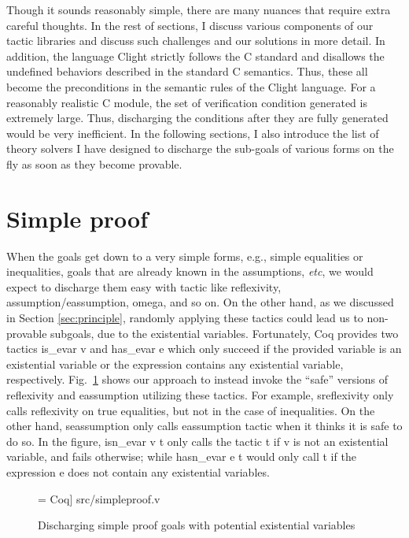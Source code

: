 Though it sounds reasonably simple, there are many nuances that require extra
careful thoughts. 
In the rest of sections, I discuss various components of our tactic libraries
and discuss such challenges and our solutions in more detail.
In addition, the language Clight strictly follows the C standard and disallows the
undefined behaviors described in the standard C semantics. Thus, these all
become the preconditions in the semantic rules of the Clight language. For a
reasonably realistic C module, the set of verification condition generated is
extremely large. Thus, discharging the conditions after they are fully generated
would be very inefficient. In the following sections, I also introduce the list of
theory solvers I have designed to discharge the sub-goals of various forms
on the fly as soon as they become provable.


\section{Simple proof}

When the goals get down to a very simple forms, e.g., simple equalities or inequalities,
goals that are already known in the assumptions, {\it etc}, we would expect to
discharge them easy with tactic like \textsf{reflexivity}, \textsf{assumption/eassumption},
\textsf{omega}, and so on. On the other hand, as we discussed in Section \ref{sec:principle},
randomly applying these tactics could lead us to non-provable subgoals, due to the
existential variables. Fortunately, Coq provides two tactics \textsf{is\_evar v}
and \textsf{has\_evar e} which only succeed if the provided variable is an existential
variable or the expression contains any existential variable, respectively.
Fig.~\ref{fig:simpleproof} shows our approach to instead invoke the ``safe'' versions
of \textsf{reflexivity} and \textsf{eassumption} utilizing these tactics.
For example, \textsf{sreflexivity} only calls \textsf{reflexivity} on true equalities,
but not in the case of inequalities. On the other hand, \textsf{seassumption}
only calls \textsf{eassumption} tactic when it thinks it is safe to do so.
In the figure, \textsf{isn\_evar v t} only calls the tactic t if \textsf{v} is not
an existential variable, and fails otherwise; while \textsf{hasn\_evar e t} would only
call \textsf{t} if the expression \textsf{e} does not contain any existential variables.

\begin{figure}
 = Coq] {src/simpleproof.v}
\caption{Discharging simple proof goals with potential existential variables}
\label{fig:simpleproof}
\end{figure}

